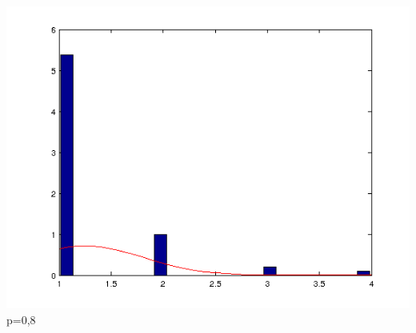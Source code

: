 \documentclass{article}
\begin{document}
\begin{center}
	\includegraphics[scale=0.5]{graph/n1p8.png} \\
	p=0,8
\end{center}
\end{document}
